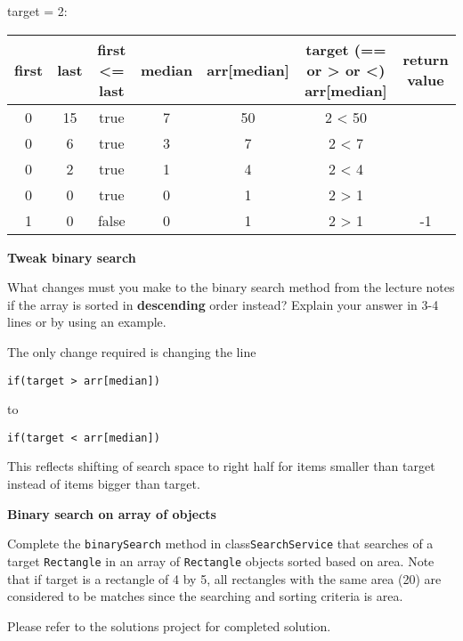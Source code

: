 \begin{questions}
\begin{solution}
target = 2:
\vskip 0.2cm
\begin{tabular}{c | c | c | c | c | c | c} 
\hline
first &	last &	first <= last & median & arr[median] & target (== or > or <) arr[median] & return value\\
\hline
0 & 15 & true & 7 & 50 & 2 < 50 & \\
0 & 6 & true & 3 & 7 & 2 < 7 & \\
0 & 2 & true & 1 & 4 & 2 < 4 & \\
0 & 0 & true & 0 & 1 & 2 > 1 & \\
1 & 0 & false & 0 & 1 & 2 > 1 & -1\\
\hline
\end{tabular}
\normalsize
\end{solution}

\question \textbf{Tweak binary search}

What changes must you make to the binary search method from the lecture notes if the array is sorted in \textbf{descending} order instead? Explain your answer in 3-4 lines or by using an example.

\begin{solution}
The only change required is changing the line

\begin{lstlisting}
if(target > arr[median])
\end{lstlisting}

to 

\begin{lstlisting}
if(target < arr[median])
\end{lstlisting}

This reflects shifting of search space to right half for items smaller than target instead of items bigger than target.
\end{solution}

\question \textbf{Binary search on array of objects}

Complete the \texttt{binarySearch} method in class\texttt{SearchService} that searches of a target \texttt{Rectangle} in an array of \texttt{Rectangle} objects sorted based on area. Note that if target is a rectangle of 4 by 5, all rectangles with the same area (20) are considered to be matches since the searching and sorting criteria is area.

\begin{solution}
Please refer to the solutions project for completed solution.	
\end{solution}

\end{questions}

